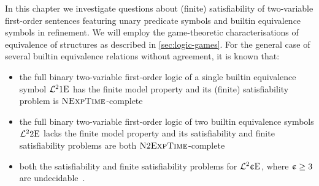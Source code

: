In this chapter we investigate questions about (finite) satisfiability of
two-variable first-order sentences featuring unary predicate symbols and builtin
equivalence symbols in refinement.
We will employ the game-theoretic characterisations of equivalence of
structures as described in \cref{sec:logic-games}.
For the general case of several builtin equivalence relations without agreement,
it is known that:
\begin{itemize}
  \item the full binary two-variable first-order logic of a single
  builtin equivalence symbol $\mathcal{L}^{2}_{{}}{1}\mathrm{E}_{{}}$ has the finite model
  property and its (finite) satisfiability problem is 
  $\text{\normalfont{\scshape NExpTime}}$-complete~\cite{kieronski2005small} 
  \item the full binary two-variable first-order logic of two
  builtin equivalence symbols $\mathcal{L}^{2}_{{}}{2}\mathrm{E}_{{}}$ lacks the finite model
  property and its satisfiability and finite satisfiability problems are both
  $\text{\normalfont{\scshape N}}2\text{\normalfont{\scshape ExpTime}}$-complete~\cite{kieronski2014two}
  \item both the satisfiability and finite satisfiability problems for
  $\mathcal{L}^{2}_{{}}{\upepsilon}\mathrm{E}_{{}}$, where $\upepsilon \geq 3$ are
  undecidable~\cite{kieronski2005small}.
\end{itemize}